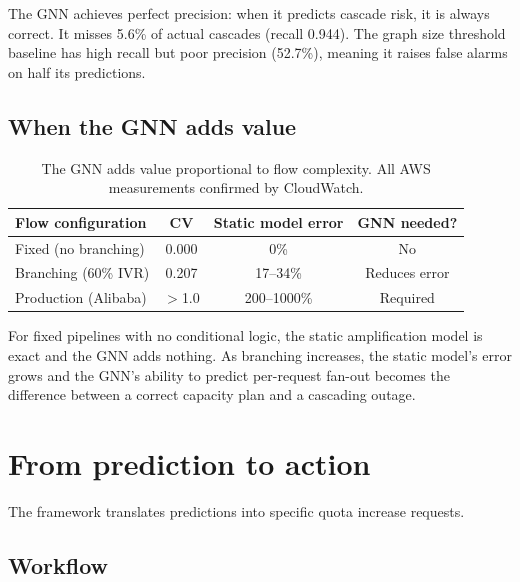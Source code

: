 \documentclass{article}
\begin{document}
The GNN achieves perfect precision: when it predicts cascade risk, it is always correct. It misses 5.6\% of actual cascades (recall 0.944). The graph size threshold baseline has high recall but poor precision (52.7\%), meaning it raises false alarms on half its predictions.

\subsection{When the GNN adds value}

\begin{table}[h]
\centering
\begin{tabular}{@{}lccc@{}}
\toprule
Flow configuration & CV & Static model error & GNN needed? \\
\midrule
Fixed (no branching) & 0.000 & 0\% & No \\
Branching (60\% IVR) & 0.207 & 17--34\% & Reduces error \\
Production (Alibaba) & $>$1.0 & 200--1000\% & Required \\
\bottomrule
\end{tabular}
\caption{The GNN adds value proportional to flow complexity. All AWS measurements confirmed by CloudWatch.}
\label{tab:when_gnn}
\end{table}

For fixed pipelines with no conditional logic, the static amplification model is exact and the GNN adds nothing. As branching increases, the static model's error grows and the GNN's ability to predict per-request fan-out becomes the difference between a correct capacity plan and a cascading outage.

\section{From prediction to action}

The framework translates predictions into specific quota increase requests.

\subsection{Workflow}
\end{document}

